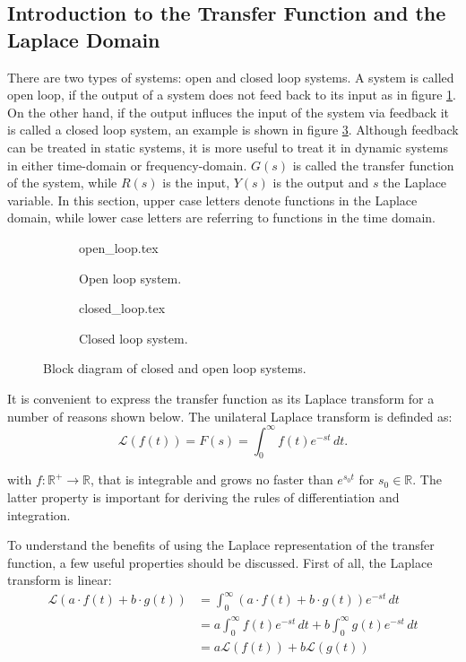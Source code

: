 \subsection{Introduction to the Transfer Function and the Laplace Domain}
\label{sec:transfer_function}
There are two types of systems: open and closed loop systems. A system is called open loop, if the output of a system does not feed back to its input as in figure \ref{fig:open_loop}. On the other hand, if the output influces the input of the system via feedback it is called a closed loop system, an example is shown in figure \ref{fig:closed_loop}. Although feedback can be treated in static systems, it is more useful to treat it in dynamic systems in either time-domain or frequency-domain. $G(s)$ is called the transfer function of the system, while $R(s)$ is the input, $Y(s)$ is the output and $s$ the Laplace variable. In this section, upper case letters  denote functions in the Laplace domain, while lower case letters are referring to functions in the time domain.

\begin{figure}[ht]
    \centering
    \begin{subfigure}{0.4\linewidth}
        \centering
        {open_loop.tex}
        \caption{Open loop system.}
        \label{fig:open_loop}
    \end{subfigure}
    \begin{subfigure}{0.4\linewidth}
        \centering
        {closed_loop.tex}
        \caption{Closed loop system.}
        \label{fig:closed_loop}
    \end{subfigure}
    \caption{Block diagram of closed and open loop systems.}
\end{figure}

It is convenient to express the transfer function as its Laplace transform for a number of reasons shown below. The unilateral Laplace transform is definded as:
\begin{equation}
    \mathscr{L}\left( f(t) \right) = F(s) = \int_0^\infty f(t) e^{-st}\,dt.
\end{equation}

with $f: \mathbb{R}^+ \to \mathbb{R}$, that is integrable and grows no faster than $e^{s_0t}$ for $s_0 \in \mathbb{R}$. The latter property is important for deriving the rules of differentiation and integration.

To understand the benefits of using the Laplace representation of the transfer function, a few useful properties should be discussed. First of all, the Laplace transform is linear:
\begin{align}
    \mathscr{L}\left(a \cdot f(t) + b \cdot g(t) \right) &= \int_0^\infty (a \cdot f(t) + b \cdot g(t)) e^{-st}\,dt \nonumber\\
    &= a \int_0^\infty f(t) e^{-st}\,dt + b \int_0^\infty g(t) e^{-st}\,dt \nonumber\\
    &= a \mathscr{L}\left(f(t)\right) + b \mathscr{L}\left(g(t)\right)
\end{align}

